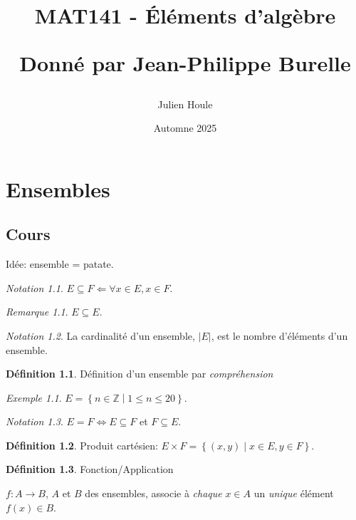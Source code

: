 \documentclass{report}
\title{MAT141 - \'El\'ements d'alg\`ebre

Donn\'e par Jean-Philippe Burelle}
\author{Julien Houle}
\date{Automne 2025}
\newcounter{cours}
\newcommand*{\cours}{\section*{Cours \thecours}\stepcounter{cours}}
\newcommand*{\card}[1]{\left| #1 \right|}
\newcommand*{\lte}{\leqslant}
\newcommand*{\entiers}{\mathbb{Z}}
\theoremstyle{definition}
\newtheorem*{defin}{D\'efinition}
\theoremstyle{remark}
\newtheorem*{exem}{Exemple}
\newtheorem*{nota}{Notation}
\newtheorem*{rema}{Remarque}
\begin{document}
	\maketitle
	\tableofcontents
	\newpage

	\chapter{Ensembles}
	\cours
	Id\'ee: ensemble = patate.


	\begin{nota}
		$E \subseteq F \Leftarrow \forall x \in E, x \in F$.
		\begin{rema}
			$E \subseteq E$.
		\end{rema}
	\end{nota}

	\begin{nota}
		La cardinalit\'e d'un ensemble, $\card{E}$, est le nombre d'\'el\'ements d'un ensemble.
	\end{nota}

	\begin{defin}
		D\'efinition d'un ensemble par \emph{compr\'ehension}
		\begin{exem}
			$E=\left\lbrace n \in \entiers \middle| 1 \lte n \lte 20 \right\rbrace$.
		\end{exem}
	\end{defin}

	\begin{nota}
		$E=F \Leftrightarrow E \subseteq F$ et $F \subseteq E$.
	\end{nota}

	\begin{defin}
		Produit cart\'esien: $E \times F=\left\lbrace (x,y) \middle| x \in E, y \in F \right\rbrace$.
	\end{defin}

	\begin{defin}
		Fonction/Application

		$f: A \to B$, $A$ et $B$ des ensembles, associe \`a \emph{chaque} $x \in A$ un \emph{unique} \'el\'ement $f(x) \in B$.
	\end{defin}
\end{document}
